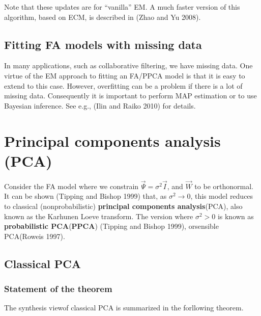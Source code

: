 Note that these updates are for “vanilla” EM. A much faster version of this algorithm, based on ECM, is described in (Zhao and Yu 2008).


\subsection{Fitting FA models with missing data}
\label{sec:Fitting-FA-models-with-missing-data}
In many applications, such as collaborative filtering, we have missing data. One virtue of the EM approach to fitting an FA/PPCA model is that it is easy to extend to this case. However, overfitting can be a problem if there is a lot of missing data. Consequently it is important to perform MAP estimation or to use Bayesian inference. See e.g., (Ilin and Raiko 2010) for details.


\section{Principal components analysis (PCA)}
\label{sec:PCA}
Consider the FA model where we constrain $\vec{\Psi}=\sigma^2\vec{I}$, and $\vec{W}$ to be orthonormal. It can be shown (Tipping and Bishop 1999) that, as $\sigma^2 \rightarrow 0$, this model reduces to classical (nonprobabilistic) \textbf{principal components analysis}(PCA), also known as the Karhunen Loeve transform. The version where $\sigma^2 > 0$ is known as \textbf{probabilistic PCA}(\textbf{PPCA}) (Tipping and Bishop 1999), orsensible PCA(Roweis 1997).


\subsection{Classical PCA}


\subsubsection{Statement of the theorem}
The synthesis viewof classical PCA is summarized in the forllowing theorem.

